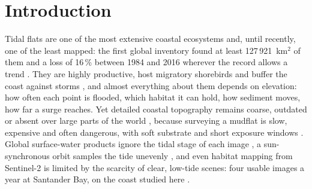 \documentclass[final,5p,times,number]{elsarticle}
\begin{document}

\section{Introduction}

Tidal flats are one of the most extensive coastal ecosystems and, until
recently, one of the least mapped: the first global inventory found at
least 127\,921~km$^2$ of them and a loss of 16\,\% between 1984 and 2016
wherever the record allows a trend \citep{murray2019}. They are highly
productive, host migratory shorebirds and buffer the coast against storms
\citep{sagar2017}, and almost everything about them depends on elevation:
how often each point is flooded, which habitat it can hold, how sediment
moves, how far a surge reaches. Yet detailed coastal topography remains
coarse, outdated or absent over large parts of the world
\citep{almar2021}, because surveying a mudflat is slow, expensive and
often dangerous, with soft substrate and short exposure windows
\citep{bell2016,sagar2017}. Global surface-water products ignore the
tidal stage of each image \citep{pekel2016,fitton2021}, a sun-synchronous
orbit samples the tide unevenly \citep{eleveld2014}, and even habitat
mapping from Sentinel-2 is limited by the scarcity of clear, low-tide
scenes: four usable images a year at Santander Bay, on the coast studied
here \citep{davies2024}.
\end{document}
